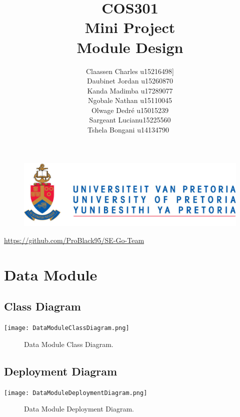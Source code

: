 \documentclass[12pt]{article}
\begin{document}
	

	\begin{figure}
		\includegraphics[width=\linewidth]{logo.jpg}	
	\end{figure}

	\title 	{
				COS301\\
				Mini Project\\
				Module Design
		}
	\author {
				Claassen Charles u15216498]\\
                Daubinet Jordan u15260870\\
                Kanda Madimba u17289077\\
                Ngobale Nathan u15110045\\
                Olwage Dedré u15015239\\
                Sargeant Lucianu15225560\\
                Tshela Bongani u14134790\
		}
	\maketitle
	\begin{center}
			\url{https://github.com/ProBlack95/SE-Go-Team}	
	\end{center}
	\newpage
	\tableofcontents
	
	\newpage
		
	\section{Data Module}
	
	\subsection{Class Diagram}
        \texttt{[image: DataModuleClassDiagram.png]}
        \begin{figure}[h]
            \caption{Data Module Class Diagram.}
        \end{figure}
    
    \subsection{Deployment Diagram}
        \texttt{[image: DataModuleDeploymentDiagram.png]}
        \begin{figure}[h]
            \caption{Data Module Deployment Diagram.}
        \end{figure}
        
\end{document}
